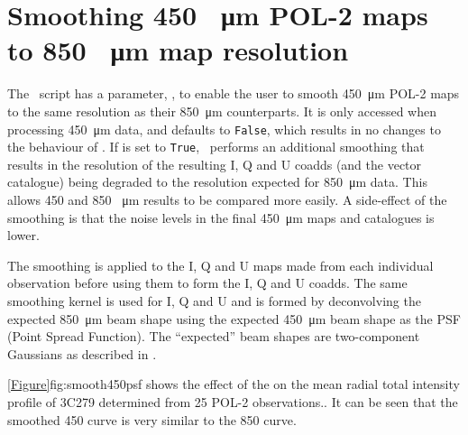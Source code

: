 \section{Smoothing 450 \SI{}{\micro\metre} POL-2 maps to 850 \SI{}{\micro\metre} map resolution}

The \poltwomap\ script has a parameter, , to enable the user to smooth
\SI{450}{\micro\metre} POL-2 maps to the same resolution as their \SI{850}{\micro\metre} counterparts. It is only accessed when processing \SI{450}{\micro\metre} data, and defaults to \texttt{False}, which results in no changes to the behaviour of \poltwomap. If  is set to \texttt{True}, \poltwomap\ performs an additional smoothing that results in the resolution of the resulting I, Q and U coadds (and the vector catalogue) being degraded to the resolution expected for \SI{850}{\micro\metre} data. This allows 450 and 850 \SI{}{\micro\metre} results to be compared more easily. A side-effect of the smoothing is that the noise levels in the final \SI{450}{\micro\metre} maps and catalogues is lower.

The smoothing is applied to the I, Q and U maps made from each individual observation before using them to form the I, Q and U coadds. The same smoothing kernel is used for I, Q and U and is formed by deconvolving the expected \SI{850}{\micro\metre} beam shape using the expected \SI{450}{\micro\metre} beam shape as the PSF (Point Spread Function). The ``expected'' beam shapes are two-component Gaussians as described in \cite{dempsey12}.

\cref{Figure}{fig:smooth450psf}{} shows the effect of the  on the mean radial total intensity profile of 3C279 determined from 25 POL-2 observations.. It can be seen that the smoothed 450 curve is very similar to the 850 curve.

